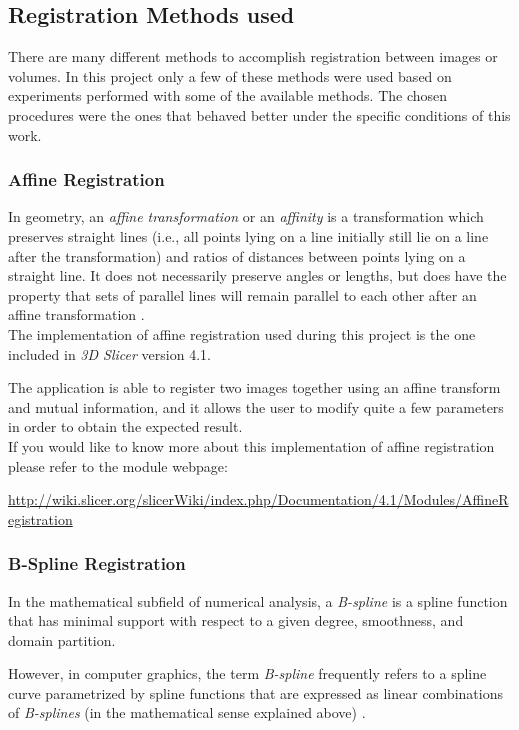 \subsection{Registration Methods used}
\label{sec:reg_methods}
There are many different methods to accomplish registration between
images or volumes. In this project only a few of these methods were
used based on experiments performed with some of the available
methods. The chosen procedures were the ones that behaved better
under the specific conditions of this work.


\subsubsection{Affine Registration}
In geometry, an \textit{affine transformation} or an \textit{affinity}
is a transformation which preserves straight lines (i.e., all points
lying on a line initially still lie on a line after the
transformation) and ratios of distances between points lying on a
straight line. It does not necessarily preserve angles or lengths, but
does have the property that sets of parallel lines will remain
parallel to each other after an affine transformation \cite{affine_t}. \\

The implementation of affine registration used during this project is
the one included in \textit{3D Slicer} version 4.1. 

The application is able to register two images together using an
affine transform and mutual information, and it allows the user to
modify quite a few parameters
in order to obtain the expected result.\\

If you would like to know more about this implementation of affine
registration please refer to the module webpage:

\url{http://wiki.slicer.org/slicerWiki/index.php/Documentation/4.1/Modules/AffineRegistration}

\subsubsection{B-Spline Registration}
In the mathematical subfield of numerical analysis, a
\textit{B-spline} is a spline function that has minimal support with
respect to a given degree, smoothness, and domain partition.

However, in computer graphics, the term \textit{B-spline} frequently
refers to a spline curve parametrized by spline functions that are
expressed as linear combinations of \textit{B-splines} (in the
mathematical sense explained above) \cite{bspline}.\\

